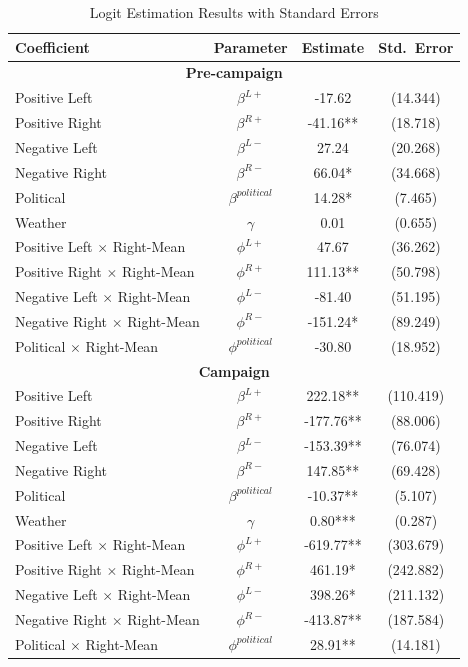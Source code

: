 \documentclass[12pt]{article}
\begin{document}
	\begin{table}[!htb]
			\caption{Logit Estimation Results with Standard Errors}
		\label{tab:logit}
		\centering
		\begin{threeparttable}
			\begin{tabular}{lccc}
				\hline
				\textbf{Coefficient} & \textbf{Parameter} & \textbf{Estimate} & \textbf{Std.\ Error} \\
				\hline
				\hline
				\multicolumn{4}{c}{\textbf{Pre-campaign}} \\
				\hline
				Positive Left & $\beta^{L+}$ & -17.62 & (14.344) \\
				Positive Right & $\beta^{R+}$ & -41.16** & (18.718) \\
				Negative Left & $\beta^{L-}$ & 27.24 & (20.268) \\
				Negative Right & $\beta^{R-}$ & 66.04* & (34.668) \\
				Political & $\beta^{political}$ & 14.28* & (7.465) \\
				Weather & $\gamma$ & 0.01 & (0.655) \\
				Positive Left $\times$ Right-Mean & $\phi^{L+}$ & 47.67 & (36.262) \\
				Positive Right $\times$ Right-Mean & $\phi^{R+}$ & 111.13** & (50.798) \\
				Negative Left $\times$ Right-Mean & $\phi^{L-}$ & -81.40 & (51.195) \\
				Negative Right $\times$ Right-Mean & $\phi^{R-}$ & -151.24* & (89.249) \\
				Political $\times$ Right-Mean & $\phi^{political}$ & -30.80 & (18.952) \\
				\hline
				\hline
				\multicolumn{4}{c}{\textbf{Campaign}} \\
				\hline
				Positive Left & $\beta^{L+}$ & 222.18** & (110.419) \\
				Positive Right & $\beta^{R+}$ & -177.76** & (88.006) \\
				Negative Left & $\beta^{L-}$ & -153.39** & (76.074) \\
				Negative Right & $\beta^{R-}$ & 147.85** & (69.428) \\
				Political & $\beta^{political}$ & -10.37** & (5.107) \\
				Weather & $\gamma$ & 0.80*** & (0.287) \\
				Positive Left $\times$ Right-Mean & $\phi^{L+}$ & -619.77** & (303.679) \\
				Positive Right $\times$ Right-Mean & $\phi^{R+}$ & 461.19* & (242.882) \\
				Negative Left $\times$ Right-Mean & $\phi^{L-}$ & 398.26* & (211.132) \\
				Negative Right $\times$ Right-Mean & $\phi^{R-}$ & -413.87** & (187.584) \\
				Political $\times$ Right-Mean & $\phi^{political}$ & 28.91** & (14.181) \\
				\hline
			\end{tabular}


\end{threeparttable}
\end{table}
\end{document}
